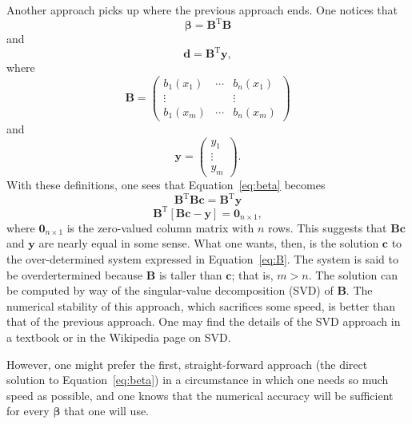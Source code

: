 \documentclass[twocolumn]{article}
\begin{document}
Another approach picks up where the previous approach ends. One notices that
\begin{equation}
   \boldsymbol{\beta} = \mathbf{B}^{\text{T}} \mathbf{B}
\end{equation}
and
\begin{equation}
   \mathbf{d} = \mathbf{B}^{\text{T}} \mathbf{y},
\end{equation}
where
\begin{equation}
   \mathbf{B} =
   \begin{pmatrix}
      b_1(x_1) & \cdots & b_n(x_1)\\
      \vdots   &        & \vdots\\
      b_1(x_m) & \cdots & b_n(x_m)
   \end{pmatrix}
\end{equation}
and
\begin{equation}
   \mathbf{y} =
   \begin{pmatrix}
      y_1\\
      \vdots\\
      y_m
   \end{pmatrix}.
\end{equation}
With these definitions, one sees that Equation~\ref{eq:beta} becomes
\begin{equation}
   \mathbf{B}^{\text{T}} \mathbf{B} \mathbf{c} = \mathbf{B}^{\text{T}}
   \mathbf{y}
\end{equation}
\begin{equation}
   \mathbf{B}^{\text{T}} [\mathbf{B} \mathbf{c} - \mathbf{y}] =
   \mathbf{0}_{n \times 1},
   \label{eq:B}
\end{equation}
where $\mathbf{0}_{n \times 1}$ is the zero-valued column matrix with $n$ rows.
This suggests that $\mathbf{B} \mathbf{c}$ and $\mathbf{y}$ are nearly equal in
some sense.  What one wants, then, is the solution $\mathbf{c}$ to the
over-determined system expressed in Equation~\ref{eq:B}. The system is said to
be overdertermined because $\mathbf{B}$ is taller than $\mathbf{c}$; that is,
$m > n$. The solution can be computed by way of the singular-value
decomposition (SVD) of $\mathbf{B}$. The numerical stability of this approach,
which sacrifices some speed, is better than that of the previous approach. One
may find the details of the SVD approach in a textbook or in the Wikipedia page
on SVD.

However, one might prefer the first, straight-forward approach (the direct
solution to Equation~\ref{eq:beta}) in a circumstance in which one needs so
much speed as possible, and one knows that the numerical accuracy will be
sufficient for every $\boldsymbol{\beta}$ that one will use.
\end{document}
